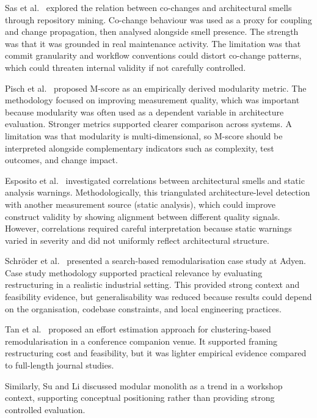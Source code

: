 \documentclass[conference]{IEEEtran}
\begin{document}
Sas et al.\ \cite{b3} explored the relation between co-changes and architectural smells through repository mining. Co-change behaviour was used as a proxy for coupling and change propagation, then analysed alongside smell presence. The strength was that it was grounded in real maintenance activity. The limitation was that commit granularity and workflow conventions could distort co-change patterns, which could threaten internal validity if not carefully controlled.

Pisch et al.\ \cite{b4} proposed M-score as an empirically derived modularity metric. The methodology focused on improving measurement quality, which was important because modularity was often used as a dependent variable in architecture evaluation. Stronger metrics supported clearer comparison across systems. A limitation was that modularity is multi-dimensional, so M-score should be interpreted alongside complementary indicators such as complexity, test outcomes, and change impact.

Esposito et al.\ \cite{b6} investigated correlations between architectural smells and static analysis warnings. Methodologically, this triangulated architecture-level detection with another measurement source (static analysis), which could improve construct validity by showing alignment between different quality signals. However, correlations required careful interpretation because static warnings varied in severity and did not uniformly reflect architectural structure.

Schr\"oder et al.\ \cite{b7} presented a search-based remodularisation case study at Adyen. Case study methodology supported practical relevance by evaluating restructuring in a realistic industrial setting. This provided strong context and feasibility evidence, but generalisability was reduced because results could depend on the organisation, codebase constraints, and local engineering practices.

Tan et al.\ \cite{b2} proposed an effort estimation approach for clustering-based remodularisation in a conference companion venue. It supported framing restructuring cost and feasibility, but it was lighter empirical evidence compared to full-length journal studies.

Similarly, Su and Li \cite{b5} discussed modular monolith as a trend in a workshop context, supporting conceptual positioning rather than providing strong controlled evaluation.
\end{document}
